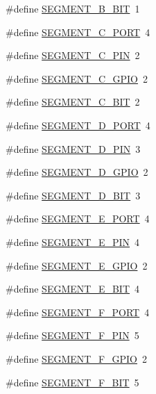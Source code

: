 \begin{DoxyCompactItemize}
\#define \hyperlink{group__hal_ga1fb8f15b7c6243abb7fe5afc76d0f3a7}{S\+E\+G\+M\+E\+N\+T\+\_\+\+B\+\_\+\+B\+IT}~1
\item 
\#define \hyperlink{group__hal_gab5bcfff6f04b87825f9cd41cc05dfb09}{S\+E\+G\+M\+E\+N\+T\+\_\+\+C\+\_\+\+P\+O\+RT}~4
\item 
\#define \hyperlink{group__hal_ga2d6f29896980f06a0f798b4a79acefe8}{S\+E\+G\+M\+E\+N\+T\+\_\+\+C\+\_\+\+P\+IN}~2
\item 
\#define \hyperlink{group__hal_ga4cfe4ae7353a040e72399dbfc61a67a3}{S\+E\+G\+M\+E\+N\+T\+\_\+\+C\+\_\+\+G\+P\+IO}~2
\item 
\#define \hyperlink{group__hal_ga50e05f6023b81a22375e3a3b3ca55075}{S\+E\+G\+M\+E\+N\+T\+\_\+\+C\+\_\+\+B\+IT}~2
\item 
\#define \hyperlink{group__hal_gabe61f02d46621e6c299da92a3f7fd334}{S\+E\+G\+M\+E\+N\+T\+\_\+\+D\+\_\+\+P\+O\+RT}~4
\item 
\#define \hyperlink{group__hal_gafec4d531aa5f0643836b0ea418197c05}{S\+E\+G\+M\+E\+N\+T\+\_\+\+D\+\_\+\+P\+IN}~3
\item 
\#define \hyperlink{group__hal_gab4e32d3448621c674df75f6561a3f193}{S\+E\+G\+M\+E\+N\+T\+\_\+\+D\+\_\+\+G\+P\+IO}~2
\item 
\#define \hyperlink{group__hal_gac28d8b2ab4ee6e397de66263de3e9d17}{S\+E\+G\+M\+E\+N\+T\+\_\+\+D\+\_\+\+B\+IT}~3
\item 
\#define \hyperlink{group__hal_gaa78d8374e4a2820b0f960c0eb08ec9af}{S\+E\+G\+M\+E\+N\+T\+\_\+\+E\+\_\+\+P\+O\+RT}~4
\item 
\#define \hyperlink{group__hal_ga21b8ebd5bdb756495bbd5020506e3dec}{S\+E\+G\+M\+E\+N\+T\+\_\+\+E\+\_\+\+P\+IN}~4
\item 
\#define \hyperlink{group__hal_gab421b06e7ab18dc5dd4ccee2159bf83e}{S\+E\+G\+M\+E\+N\+T\+\_\+\+E\+\_\+\+G\+P\+IO}~2
\item 
\#define \hyperlink{group__hal_ga8a940df92110f2842ca04f7284c527da}{S\+E\+G\+M\+E\+N\+T\+\_\+\+E\+\_\+\+B\+IT}~4
\item 
\#define \hyperlink{group__hal_ga0b8cd72e840f8d84d40a207717e5096c}{S\+E\+G\+M\+E\+N\+T\+\_\+\+F\+\_\+\+P\+O\+RT}~4
\item 
\#define \hyperlink{group__hal_gab0c22941f3ad67bc6e58c1180fb4ee2f}{S\+E\+G\+M\+E\+N\+T\+\_\+\+F\+\_\+\+P\+IN}~5
\item 
\#define \hyperlink{group__hal_ga78861fb42c43e8eccd9f9c89197846ca}{S\+E\+G\+M\+E\+N\+T\+\_\+\+F\+\_\+\+G\+P\+IO}~2
\item 
\#define \hyperlink{group__hal_ga72af432101a174e6dbadba56d617c8c0}{S\+E\+G\+M\+E\+N\+T\+\_\+\+F\+\_\+\+B\+IT}~5

\end{DoxyCompactItemize}
